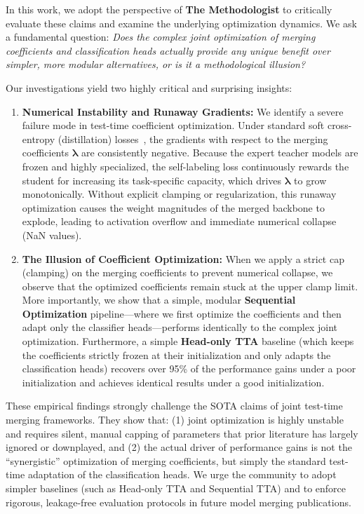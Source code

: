 \documentclass{article}
\theoremstyle{plain}
\theoremstyle{definition}
\theoremstyle{remark}
\begin{document}
In this work, we adopt the perspective of \textbf{The Methodologist} to critically evaluate these claims and examine the underlying optimization dynamics. We ask a fundamental question: \emph{Does the complex joint optimization of merging coefficients and classification heads actually provide any unique benefit over simpler, more modular alternatives, or is it a methodological illusion?}

Our investigations yield two highly critical and surprising insights:
\begin{enumerate}
    \item \textbf{Numerical Instability and Runaway Gradients:} We identify a severe failure mode in test-time coefficient optimization. Under standard soft cross-entropy (distillation) losses~\cite{hinton2015distilling}, the gradients with respect to the merging coefficients $\boldsymbol{\lambda}$ are consistently negative. Because the expert teacher models are frozen and highly specialized, the self-labeling loss continuously rewards the student for increasing its task-specific capacity, which drives $\boldsymbol{\lambda}$ to grow monotonically. Without explicit clamping or regularization, this runaway optimization causes the weight magnitudes of the merged backbone to explode, leading to activation overflow and immediate numerical collapse (NaN values).
    \item \textbf{The Illusion of Coefficient Optimization:} When we apply a strict cap (clamping) on the merging coefficients to prevent numerical collapse, we observe that the optimized coefficients remain stuck at the upper clamp limit. More importantly, we show that a simple, modular \textbf{Sequential Optimization} pipeline—where we first optimize the coefficients and then adapt only the classifier heads—performs identically to the complex joint optimization. Furthermore, a simple \textbf{Head-only TTA} baseline (which keeps the coefficients strictly frozen at their initialization and only adapts the classification heads) recovers over 95\% of the performance gains under a poor initialization and achieves identical results under a good initialization.
\end{enumerate}

These empirical findings strongly challenge the SOTA claims of joint test-time merging frameworks. They show that: (1) joint optimization is highly unstable and requires silent, manual capping of parameters that prior literature has largely ignored or downplayed, and (2) the actual driver of performance gains is not the ``synergistic'' optimization of merging coefficients, but simply the standard test-time adaptation of the classification heads. We urge the community to adopt simpler baselines (such as Head-only TTA and Sequential TTA) and to enforce rigorous, leakage-free evaluation protocols in future model merging publications.
\end{document}
